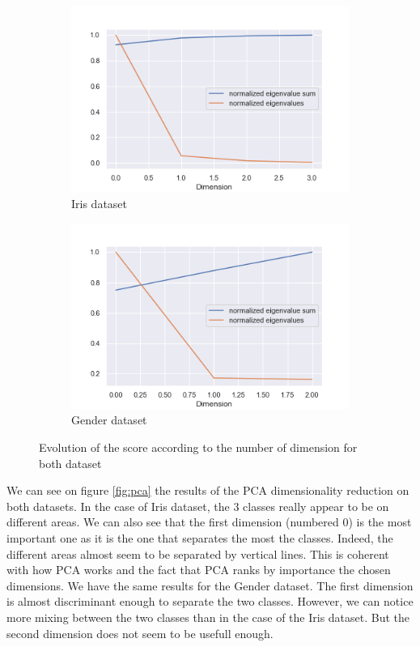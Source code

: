 \documentclass[twocolumn, 10pt]{article}
\begin{document}
			\begin{figure}[h]
				\centering
				\begin{subfigure}[t]{0.49\columnwidth}
					\centering
					\includegraphics[width=\linewidth]{../graphics/PCA_dimension_importance_4.png}
					\caption{Iris dataset}
					\label{fig:pca_iris_score}
				\end{subfigure}
				\begin{subfigure}[t]{0.49\columnwidth}
					\centering
					\includegraphics[width=\linewidth]{../graphics/PCA_dimension_importance_3.png}
					\caption{Gender dataset}
					\label{fig:pca_g_score}
				\end{subfigure}
				\caption{Evolution of the score according to the number of dimension for both dataset}
				\label{fig:pca_score}
			\end{figure}

			We can see on figure \ref{fig:pca} the results of the PCA dimensionality reduction on both datasets. In the case of Iris dataset, the 3 classes really appear to be on different areas. We can also see that the first dimension (numbered $0$) is the most important one as it is the one that separates the most the classes. Indeed, the different areas almost seem to be separated by vertical lines. This is coherent with how PCA works and the fact that PCA ranks by importance the chosen dimensions. We have the same results for the Gender dataset. The first dimension is almost discriminant enough to separate the two classes. However, we can notice more mixing between the two classes than in the case of the Iris dataset. But the second dimension does not seem to be usefull enough.
\end{document}
